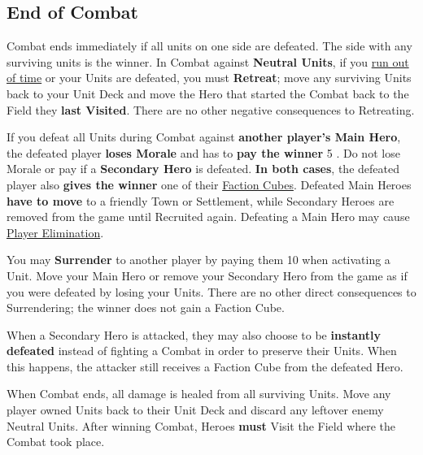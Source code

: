 \begin{multicols}{2}
\subsection*{\hypertarget{Endcombat}{End of Combat}}
Combat ends immediately if all units on one side are defeated.
The side with any surviving units is the winner.
In Combat against \textbf{Neutral Units}, if you \hyperlink{Timelimit}{run out of time} or your Units are defeated, you must \textbf{Retreat}; move any surviving Units back to your Unit Deck and move the Hero that started the Combat back to the Field they \textbf{last Visited}.
There are no other negative consequences to Retreating.\par
{}\par
If you defeat all Units during Combat against \textbf{another player's Main Hero}, the defeated player \textbf{loses Morale} and has to \textbf{pay the winner} 5 .
Do not lose Morale or pay  if a \textbf{Secondary Hero} is defeated.
\textbf{In both cases}, the defeated player also \textbf{gives the winner} one of their \hyperlink{End}{Faction Cubes}.
Defeated Main Heroes \textbf{have to move} to a friendly Town or Settlement, while Secondary Heroes are removed from the game until Recruited again.
Defeating a Main Hero may cause \hyperlink{End}{Player Elimination}.\par
You may \textbf{Surrender} to another player by paying them 10  when activating a Unit.
Move your Main Hero or remove your Secondary Hero from the game as if you were defeated by losing your Units.
There are no other direct consequences to Surrendering; the winner does not gain a Faction Cube.\par
{}\par
When a Secondary Hero is attacked, they may also choose to be \textbf{instantly defeated} instead of fighting a Combat in order to preserve their Units.
When this happens, the attacker still receives a Faction Cube from the defeated Hero.\par
When Combat ends, all damage is healed from all surviving Units.
Move any player owned Units back to their Unit Deck and discard any leftover enemy Neutral Units.
After winning Combat, Heroes \textbf{must} Visit the Field where the Combat took place.


\end{multicols}
